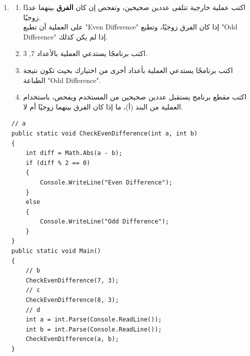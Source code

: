 ﻿\documentclass[14pt]{extarticle}
\begin{document}
\begin{enumerate}[itemsep=3em]
\begin{enumerate}
\begin{boxSolution}
\begin{english}
\begin{verbatim}
    // b
    double n = double.Parse(Console.ReadLine());
    result = Root10(n);
    Console.WriteLine(result);

    // c
    double a = double.Parse(Console.ReadLine());
    double b = double.Parse(Console.ReadLine());
    if (Math.Abs(Root10(a) - Root10(b)) < 10)
    {
        Console.WriteLine("Close");
    }
    else
    {
        Console.WriteLine("Not Close");
    }
}
\end{verbatim}
\end{english}
\end{boxSolution}
\clearpage
\fi

\item
\begin{enumerate}
\item اكتب عملية خارجية تتلقى عددين صحيحين، وتفحص إن كان \textbf{الفرق} بينهما عددًا زوجيًا. \\
على العملية أن تطبع \textenglish{"Even Difference"} إذا كان الفرق زوجيًا،
وتطبع \textenglish{"Odd Difference"} إذا لم يكن كذلك.
\item اكتب برنامجًا يستدعي العملية بالأعداد \textenglish{7, 3}.
\item اكتب برنامجًا يستدعي العملية بأعداد أخرى من اختيارك بحيث تكون نتيجة الطباعة \textenglish{"Odd Difference"}.
\item اكتب مقطع برنامج يستقبل عددين صحيحين من المستخدم ويفحص، باستخدام العملية من البند (أ)، ما إذا كان الفرق بينهما زوجيًا أم لا.
\end{enumerate}

\ifwithsols
\begin{boxSolution}
\begin{english}
\begin{verbatim}
// a
public static void CheckEvenDifference(int a, int b)
{
    int diff = Math.Abs(a - b);
    if (diff % 2 == 0)
    {
        Console.WriteLine("Even Difference");
    }
    else
    {
        Console.WriteLine("Odd Difference");
    }
}
public static void Main()
{
    // b
    CheckEvenDifference(7, 3);
    // c
    CheckEvenDifference(8, 3);
    // d
    int a = int.Parse(Console.ReadLine());
    int b = int.Parse(Console.ReadLine());
    CheckEvenDifference(a, b);
}
\end{verbatim}
\end{english}
\end{boxSolution}
\fi


\end{enumerate}
\end{enumerate}
\end{document}
